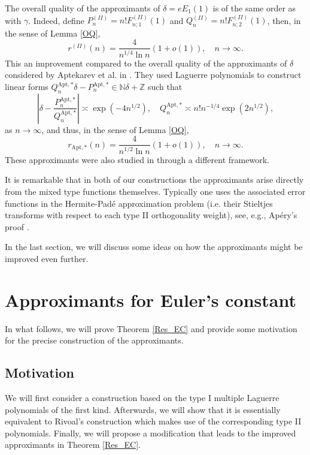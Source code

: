 \documentclass[a4paper,12pt,oneside]{article}
\theoremstyle{definition}
\newcommand{\N}{\mathbb{N}}
\newcommand{\Z}{\mathbb{Z}}
\begin{document}
The overall quality of the approximants of $\delta=eE_1(1)$ is of the same order as with $\gamma$. Indeed, define $P_n^{(II)}=n!F_{n;1}^{(II)}(1)$ and $Q_n^{(II)} =n! F_{n;2}^{(II)}(1) $, then, in the sense of Lemma \ref{OQ},
    $$ r^{(II)}(n) = \frac{4}{n^{1/4}\ln n} (1+o(1)),\quad n\to\infty. $$
This an improvement compared to the overall quality of the approximants of $\delta$ considered by Aptekarev et al. in \cite[Section 1]{Apt}. They used Laguerre polynomials to construct linear forms $Q_n^{\text{Apt},\ast} \delta - P_n^{\text{Apt},\ast} \in\N\delta + \Z$ such that
    $$ \left| \delta - \frac{P_n^{\text{Apt},\ast}}{Q_n^{\text{Apt},\ast}} \right| \asymp \exp(-4n^{1/2}),\quad Q_n^{\text{Apt},\ast} \asymp n! n^{-1/4} \exp(2n^{1/2}), $$
as $n\to\infty$, and thus, in the sense of Lemma \ref{OQ},
    $$ r_{\text{Apt},\ast}(n) = \frac{4}{n^{1/2}\ln n} (1+o(1)),\quad n\to\infty . $$
These approximants were also studied in \cite[Theorem 2]{PilehroodLag} through a different framework.
\medbreak

It is remarkable that in both of our constructions the approximants arise directly from the mixed type functions themselves. Typically one uses the associated error functions in the Hermite-Padé approximation problem (i.e. their Stieltjes transforms with respect to each type II orthogonality weight), see, e.g., Apéry's proof \cite{Apery}. 
\medbreak

In the last section, we will discuss some ideas on how the approximants might be improved even further.



\section{Approximants for Euler's constant}

In what follows, we will prove Theorem \ref{Res_EC} and provide some motivation for the precise construction of the approximants.

\subsection{Motivation} \label{L_I}

We will first consider a construction based on the type I multiple Laguerre polynomials of the first
kind. Afterwards, we will show that it is essentially equivalent to Rivoal's construction which makes use of the corresponding type II polynomials. Finally, we will propose a modification that leads to the improved approximants in Theorem \ref{Res_EC}.
\medbreak
\end{document}
